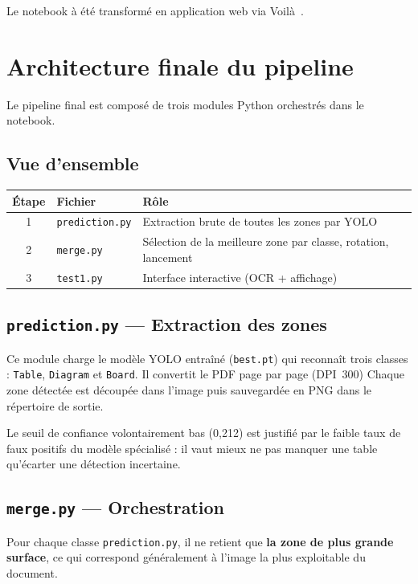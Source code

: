 \documentclass[a4paper,11pt]{article} %
\begin{document}
Le notebook à été transformé en application web via Voilà~\cite{voila}.

\section{Architecture finale du pipeline}

Le pipeline final est composé de trois modules Python orchestrés dans le notebook.

\subsection{Vue d'ensemble}

\begin{center}
\begin{tabular}{clp{6cm}}
\toprule
Étape & Fichier & Rôle \\
\midrule
1 & \texttt{prediction.py} & Extraction brute de toutes les zones par YOLO \\
2 & \texttt{merge.py}      & Sélection de la meilleure zone par classe, rotation, lancement \\
3 & \texttt{test1.py}      & Interface interactive (OCR + affichage) \\
\bottomrule
\end{tabular}
\end{center}

\subsection{\texttt{prediction.py} --- Extraction des zones}

Ce module charge le modèle YOLO entraîné (\texttt{best.pt}) qui reconnaît trois classes :
\texttt{Table}, \texttt{Diagram} et \texttt{Board}.
Il convertit le PDF page par page (DPI~300)
Chaque zone détectée est découpée dans l'image puis sauvegardée en PNG dans le répertoire de sortie.

Le seuil de confiance volontairement bas (0,212) est justifié par le faible taux de faux
positifs du modèle spécialisé : il vaut mieux ne pas manquer une table
qu'écarter une détection incertaine.

\subsection{\texttt{merge.py} --- Orchestration}

Pour chaque classe \texttt{prediction.py}, il ne retient que \textbf{la zone de plus grande surface},
ce qui correspond généralement à l'image la plus exploitable du document.
\end{document}
